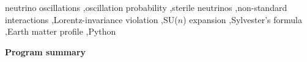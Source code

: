 \documentclass[final,5p,times,twocolumn,sort,compress]{elsarticle}
\begin{document}
\begin{frontmatter}
\begin{abstract}
\end{abstract}

\begin{keyword}

neutrino oscillations \sep oscillation probability \sep sterile neutrinos \sep non-standard interactions \sep Lorentz-invariance violation \sep SU($n$) expansion \sep Sylvester's formula \sep Earth matter profile \sep Python

\end{keyword}

\end{frontmatter}

\noindent
{\bf Program summary}
\smallskip

\begin{small}


\end{small}
\end{document}
